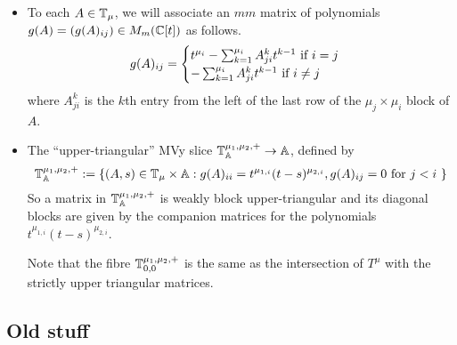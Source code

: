 \documentclass[draft]{article}
\begin{document}
\begin{itemize}
    \item To each $ A \in \mathbb T_\mu$, we will associate an $m$\times$m$ matrix of polynomials $ g(A) = \left( g(A)_{ij} \right) \in M_m(\mathbb C[t]) $ as follows.
       \begin{equation}
            g(A)_{ij} = \begin{cases} t^{\mu_i} - \sum_{k=1}^{\mu_i} A^k_{ji} t^{k-1} \text{ if $ i = j$} \\
             - \sum_{k=1}^{\mu_i} A^k_{ji} t^{k-1} \text{ if $ i \ne j$ }
        \end{cases}
    \end{equation}
    where $A^k_{ji}$ is the $k$th entry from the left of the last row of the $\mu_j\times\mu_i$ block of $A$. 
    
    \item The ``upper-triangular'' MVy slice $\mathbb T^{\mu_1, \mu_2,+}_\mathbb A \rightarrow \mathbb A $, defined by
    $$
    \mathbb T^{\mu_1, \mu_2,+}_\mathbb A := \{ (A,s) \in \mathbb T_\mu \times \mathbb A : g(A)_{ii} = t^{\mu_{1,i}} (t-s)^{\mu_{2,i}}, g(A)_{ij} = 0 \text{ for $ j < i $ }\}
    $$
    So a matrix in $\mathbb T^{\mu_1, \mu_2,+}_\mathbb A  $ is weakly block upper-triangular and its diagonal blocks are given by the companion matrices for the polynomials $t^{\mu_{1,i}} (t-s)^{\mu_{2,i}}$.
    
    Note that the fibre $  \mathbb T^{\mu_1, \mu_2,+}_{0,0}$ is the same as the intersection of $ T^\mu $ with the strictly upper triangular matrices.
    

\end{itemize}

\subsection{Old stuff}
% 
\end{document}
